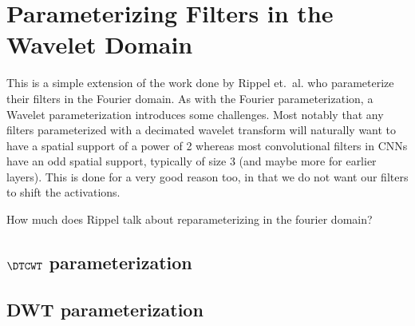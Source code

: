 \section{Parameterizing Filters in the Wavelet Domain}\label{sec:ch6:reparameterization}
This is a simple extension of the work done by Rippel et.\ al. who parameterize
their filters in the Fourier domain.
As with the Fourier parameterization, a Wavelet parameterization
introduces some challenges. Most notably that any filters parameterized with a
decimated wavelet transform will naturally want to have a spatial support of a
power of 2 whereas most convolutional filters in CNNs have an odd spatial
support, typically of size 3 (and maybe more for earlier layers). This is done
for a very good reason too, in that we do not want our filters to shift the
activations. 

How much does Rippel talk about reparameterizing in the fourier domain?
\subsection{$\DTCWT$ parameterization}

\subsection{DWT parameterization}
